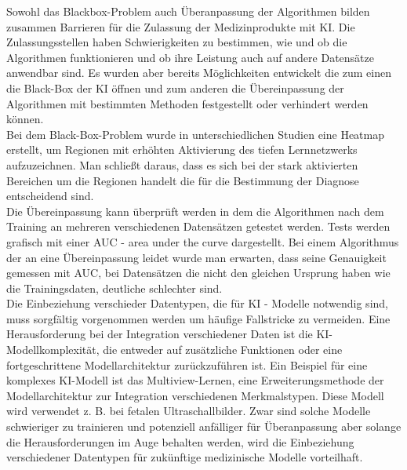 Sowohl das Blackbox-Problem auch Überanpassung der Algorithmen bilden zusammen Barrieren für die Zulassung der Medizinprodukte mit KI. Die Zulassungsstellen haben Schwierigkeiten zu bestimmen, wie und ob die Algorithmen funktionieren und ob ihre Leistung auch auf andere Datensätze anwendbar sind.\cite{AI_where_are_we_now} Es wurden aber bereits Möglichkeiten entwickelt die zum einen die Black-Box der KI öffnen und zum anderen die Übereinpassung der Algorithmen mit bestimmten Methoden festgestellt oder verhindert werden können.\cite{AI_where_are_we_now} \\

Bei dem Black-Box-Problem wurde in unterschiedlichen Studien eine Heatmap erstellt, um Regionen mit erhöhten Aktivierung des tiefen Lernnetzwerks aufzuzeichnen. Man schließt daraus, dass es sich bei der stark aktivierten Bereichen um die Regionen handelt die für die Bestimmung der Diagnose entscheidend sind.\cite{AI_where_are_we_now}\\
Die Übereinpassung kann überprüft werden in dem die Algorithmen nach dem Training an mehreren verschiedenen Datensätzen getestet werden.\cite{AI_where_are_we_now} Tests werden grafisch mit einer AUC - area under the curve  dargestellt. Bei einem Algorithmus der an eine Übereinpassung leidet wurde man erwarten, dass seine Genauigkeit gemessen mit AUC, bei Datensätzen die nicht den gleichen Ursprung haben wie die Trainingsdaten, deutliche schlechter sind.\cite{AI_where_are_we_now}\\

Die Einbeziehung verschieder Datentypen, die für KI - Modelle notwendig sind, muss sorgfältig vorgenommen werden um häufige Fallstricke zu vermeiden. Eine Herausforderung bei der Integration verschiedener Daten ist die KI-Modellkomplexität, die entweder auf zusätzliche Funktionen oder eine fortgeschrittene Modellarchitektur zurückzuführen ist. Ein Beispiel für eine komplexes KI-Modell ist das Multiview-Lernen, eine Erweiterungsmethode der Modellarchitektur zur Integration verschiedenen Merkmalstypen. Diese Modell wird verwendet z. B. bei fetalen Ultraschallbilder. Zwar sind solche Modelle schwieriger zu trainieren und potenziell anfälliger für Überanpassung aber solange die Herausforderungen im Auge behalten werden, wird die Einbeziehung verschiedener Datentypen für zukünftige medizinische Modelle vorteilhaft.\cite{The_missing_pieces}